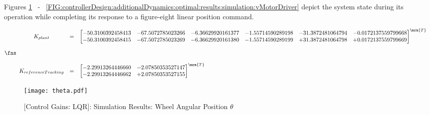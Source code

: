 \documentclass[crop=false,float=true,class=scrreprt]{standalone}
\begin{document}
Figures
\ref{FIG:controllerDesign:additionalDynamics:optimal:results:simulation:theta}~%
-~%
\ref{FIG:controllerDesign:additionalDynamics:optimal:results:simulation:vMotorDriver}
depict the system state during its operation
while completing its response to a figure-eight linear position command.




\clearpage




\begin{landscape}

\vspace*{\fill}
\begin{equation}
\fns
\label{EQN:controllerDesign:additionalDynamics:optimal:results:simulation:K}
\begin{array}{ccl}
K_{plant}
& = &
\begin{bmatrix}
-50.3100392458413 & -67.5072785023266 & -6.36629920161377 & -1.55714590289198 & -31.3872481064794 & -0.0172137559799668 \\
-50.3100392458415 & -67.5072785023269 & -6.36629920161380 & -1.55714590289199 & +31.3872481064798 & +0.0172137559799669 \\
\end{bmatrix}^{\mrm{T}}
\\[+4em]
K_{referenceTracking}
& = &
\begin{bmatrix}
-2.29913264446660 & -2.07850353527147 \\
-2.29913264446662 & +2.07850353527155 \\
\end{bmatrix}^{\mrm{T}}
\end{array}
\end{equation}
\vspace*{+4.5em}
\vspace*{\fill}

\end{landscape}




\clearpage




\vspace*{\fill}
\begin{figure}[H]%
\centering%
\texttt{[image: theta.pdf]}%
\caption[{[Control Gains: LQR]: Simulation Results: Wheel Angular Position $\theta$}]%
        {{[Control Gains: LQR]: Simulation Results: Wheel Angular Position $\theta$%
          \label{FIG:controllerDesign:additionalDynamics:optimal:results:simulation:theta}%
        }}%
\end{figure}
\vspace*{\fill}
\end{document}
